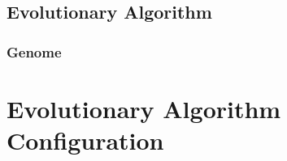 
\section{Evolutionary Algorithm} %
\label{sec:evolutionary_algorithm}

\subsection{Genome} %
\label{sub:genome}



\chapter{Evolutionary Algorithm Configuration} %
\label{cha:evolutionary_algorithm_configuration}

